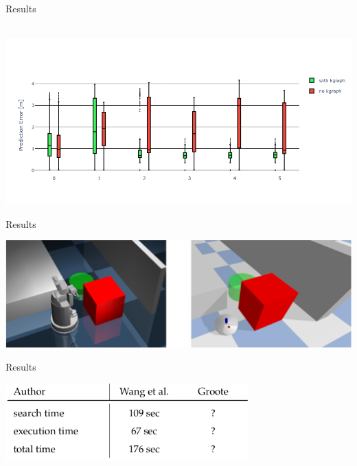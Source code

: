 
\begin{frame}[fragile]{Results} 
\begin{center}
  \hbox{\hspace{-0.05\textwidth} \includegraphics[width=1.1\textwidth]{figures/results/random_push_pe_vs}}
\end{center}
\end{frame}


\begin{frame}[fragile]{Results} 
\begin{center}
 \includegraphics[width=1.0\textwidth]{figures/results/compare_sota}
\end{center}
\end{frame}


\begin{frame}[fragile]{Results} 
\begin{center}
 \includegraphics[width=0.7\textwidth]{figures/results/wang_groote_1}
\end{center}
\end{frame}

